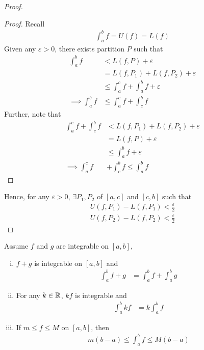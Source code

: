 \documentclass[11pt]{article}
\begin{document}
\begin{proof}
		\begin{proof}
			Recall
			\begin{align}
				\int_a^b f = U(f) = L(f)
			\end{align}
			Given any $\varepsilon > 0$, there exists partition $P$ such that
			\begin{align}
				\int_a^b f
				&< L(f, P) + \varepsilon \\
				&= L(f, P_1) + L(f, P_2) + \varepsilon \\
				&\leq \int_a^c f + \int_a^b f + \varepsilon \\
				\implies \int_a^b f &\leq \int_a^c f + \int_c^b f
			\end{align}
			Further, note that
			\begin{align}
				\int_a^c f + \int_c^b f &< L(f, P_1) + L(f, P_2) + \varepsilon \\
				&= L(f, P) + \varepsilon \\
				&\leq \int_a^b f + \varepsilon \\
				\implies \int_a^c f &+ \int_c^b f \leq \int_a^b f
			\end{align}
		\end{proof}
		Hence, for any $\varepsilon > 0$, $\exists P_1, P_2$ of $[a, c]$ and $[c, b]$ such that
		\begin{align}
			U(f, P_1) - L(f, P_1) < \frac{\varepsilon}{2} \\
			U(f, P_2) - L(f, P_2) < \frac{\varepsilon}{2}
		\end{align}
	\end{proof}
	
	\begin{theorem}
		Assume $f$ and $g$ are integrable on $[a, b]$,
		\begin{enumerate}[(i)]
			\item $f + g$ is integrable on $[a, b]$ and
				\begin{align}
					\int_a^b f + g &= \int_a^b f + \int_a^b g
				\end{align}
			\item For any $k \in \mathbb{R}$, $kf$ is integrable and 
				\begin{align}
					\int_a^b kf &= k \int_a^b f
				\end{align}
			\item If $m \leq f \leq M$ on $[a, b]$, then 
				\begin{align}
					m (b-a) \leq \int_a^b f \leq M (b-a)
				\end{align}
		\end{enumerate}
	\end{theorem}
\end{document}

